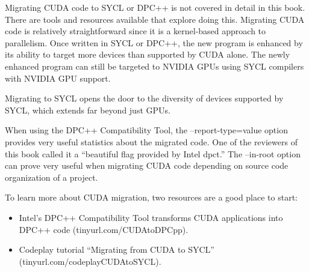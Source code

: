 Migrating CUDA code to SYCL or DPC++ is not covered in detail in this book. There are tools and resources available that explore doing this. Migrating CUDA code is relatively straightforward since it is a kernel-based approach to parallelism. Once written in SYCL or DPC++, the new program is enhanced by its ability to target more devices than supported by CUDA alone. The newly enhanced program can still be targeted to NVIDIA GPUs using SYCL compilers with NVIDIA GPU support.\par

Migrating to SYCL opens the door to the diversity of devices supported by SYCL, which extends far beyond just GPUs.\par

When using the DPC++ Compatibility Tool, the --report-type=value option provides very useful statistics about the migrated code. One of the reviewers of this book called it a “beautiful flag provided by Intel dpct.” The --in-root option can prove very useful when migrating CUDA code depending on source code organization of a project.\par

To learn more about CUDA migration, two resources are a good place to start:\par

\begin{itemize}
	\item Intel’s DPC++ Compatibility Tool transforms CUDA applications into DPC++ code (tinyurl.com/CUDAtoDPCpp).
	\item Codeplay tutorial “Migrating from CUDA to SYCL” 	(tinyurl.com/codeplayCUDAtoSYCL).
\end{itemize}















